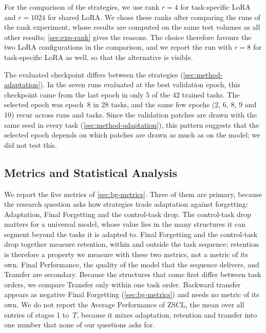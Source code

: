 For the comparison of the strategies, we use rank $r = 4$ for task-specific LoRA and $r = 1024$ for shared LoRA.
We chose these ranks after comparing the runs of the rank experiment, whose results are computed on the same test volumes as all other results; \cref{sec:exp-rank} gives the reasons.
The choice therefore favours the two LoRA configurations in the comparison, and we report the run with $r = 8$ for task-specific LoRA as well, so that the alternative is visible.

The evaluated checkpoint differs between the strategies (\cref{sec:method-adaptation}).
In the seven runs evaluated at the best validation epoch, this checkpoint came from the last epoch in only 5 of the 42 trained tasks.
The selected epoch was epoch~8 in 28 tasks, and the same few epochs (2, 6, 8, 9 and 10) recur across runs and tasks.
Since the validation patches are drawn with the same seed in every task (\cref{sec:method-adaptation}), this pattern suggests that the selected epoch depends on which patches are drawn as much as on the model; we did not test this.

\subsection{Metrics and Statistical Analysis}
\label{subsec:exp-metrics}

We report the five metrics of \cref{sec:bg-metrics}.
Three of them are primary, because the research question asks how strategies trade adaptation against forgetting: Adaptation, Final Forgetting and the control-task drop.
The control-task drop matters for a universal model, whose value lies in the many structures it can segment beyond the tasks it is adapted to.
Final Forgetting and the control-task drop together measure retention, within and outside the task sequence; retention is therefore a property we measure with these two metrics, not a metric of its own.
Final Performance, the quality of the model that the sequence delivers, and Transfer are secondary.
Because the structures that come first differ between task orders, we compare Transfer only within one task order.
Backward transfer appears as negative Final Forgetting (\cref{sec:bg-metrics}) and needs no metric of its own.
We do not report the Average Performance of ZSCL, the mean over all entries of stages 1 to~$T$, because it mixes adaptation, retention and transfer into one number that none of our questions asks for.

